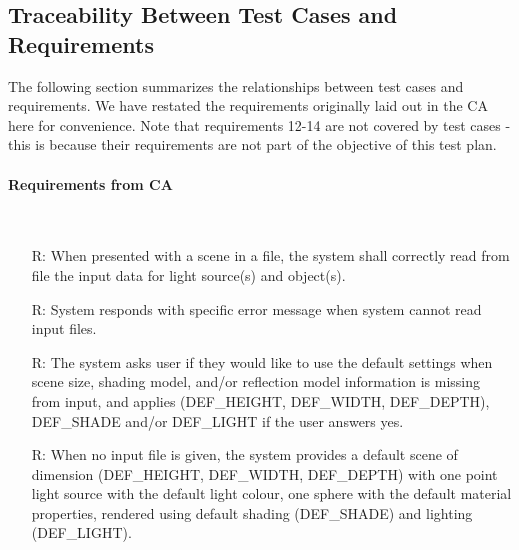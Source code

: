 \documentclass[12pt, titlepage]{article}
\newcounter{reqnum} %
\begin{document}
\subsection{Traceability Between Test Cases and Requirements}
The following section summarizes the relationships between test cases and 
requirements. We have restated the requirements originally laid out in  the CA 
here for convenience. Note that requirements 12-14 are not covered by test 
cases - this is because their requirements are not part of the objective of 
this test plan.

\paragraph{Requirements from CA}
~\newline
\noindent 
\begin{itemize}
	\item[R\refstepcounter{reqnum}\thereqnum \label{R_Inputs1}:] When presented 
	with a scene in a file, the system shall correctly read from file the 
	input data for light source(s) and object(s).
	
	\item[R\refstepcounter{reqnum}\thereqnum \label{R_Inputs1Err}:]System 
	responds with specific error message when system cannot read input files.
	
	\item[R\refstepcounter{reqnum}\thereqnum \label{R_Inputs1Err-Def}:]	The 
	system asks user if they would like to use the default settings when scene 
	size, shading model, and/or reflection model information is missing from 
	input, and applies (DEF\_HEIGHT, DEF\_WIDTH, DEF\_DEPTH), DEF\_SHADE and/or 
	DEF\_LIGHT if the user answers yes.
	
	\item[R\refstepcounter{reqnum}\thereqnum \label{R_DefaultScene}:]When no 
	input file is given, the system provides a default scene of dimension 
	(DEF\_HEIGHT, DEF\_WIDTH, DEF\_DEPTH) with one point light source with the 
	default light colour, one sphere with the default material properties, 
	rendered using default shading (DEF\_SHADE) and lighting (DEF\_LIGHT).
	

\end{itemize}
\end{document}

